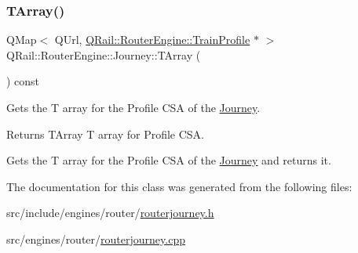 \subsubsection{\texorpdfstring{TArray()}{TArray()}}
{\footnotesize\ttfamily Q\+Map$<$ Q\+Url, \mbox{\hyperlink{classQRail_1_1RouterEngine_1_1TrainProfile}{Q\+Rail\+::\+Router\+Engine\+::\+Train\+Profile}} $\ast$ $>$ Q\+Rail\+::\+Router\+Engine\+::\+Journey\+::\+T\+Array (\begin{DoxyParamCaption}{ }\end{DoxyParamCaption}) const}



Gets the T array for the Profile C\+SA of the \mbox{\hyperlink{classQRail_1_1RouterEngine_1_1Journey}{Journey}}. 

\begin{DoxyReturn}{Returns}
T\+Array T array for Profile C\+SA.
\end{DoxyReturn}
Gets the T array for the Profile C\+SA of the \mbox{\hyperlink{classQRail_1_1RouterEngine_1_1Journey}{Journey}} and returns it. 

The documentation for this class was generated from the following files\+:\begin{DoxyCompactItemize}
\item 
src/include/engines/router/\mbox{\hyperlink{routerjourney_8h}{routerjourney.\+h}}\item 
src/engines/router/\mbox{\hyperlink{routerjourney_8cpp}{routerjourney.\+cpp}}\end{DoxyCompactItemize}

